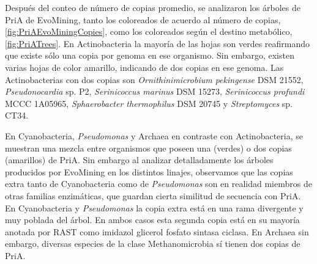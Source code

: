 \documentclass[12pt,twoside]{reedthesis}
\begin{document}
  Después del conteo de número de copias promedio, se analizaron los
  árboles de PriA de EvoMining, tanto los coloreados de acuerdo al número
  de copias, \autoref{fig:PriAEvoMiningCopies}, como los coloreados según
  el destino metabólico, \autoref{fig:PriATrees}. En Actinobacteria la
  mayoría de las hojas son verdes reafirmando que existe sólo una copia
  por genoma en ese organismo. Sin embargo, existen varias hojas de color
  amarillo, indicando de dos copias en ese genoma. Las Actinobacterias con
  dos copias son \emph{Ornithinimicrobium pekingense} DSM 21552,
  \emph{Pseudonocardia} sp. P2, \emph{Serinicoccus marinus} DSM 15273,
  \emph{Serinicoccus profundi} MCCC 1A05965, \emph{Sphaerobacter
  thermophilus} DSM 20745 y \emph{Streptomyces} sp. CT34.
  
  En Cyanobacteria, \emph{Pseudomonas} y Archaea en contraste con
  Actinobacteria, se muestran una mezcla entre organismos que poseen una
  (verdes) o dos copias (amarillos) de PriA. Sin embargo al analizar
  detalladamente los árboles producidos por EvoMining en los distintos
  linajes, observamos que las copias extra tanto de Cyanobacteria como de
  \emph{Pseudomonas} son en realidad miembros de otras familias
  enzimáticas, que guardan cierta similitud de secuencia con PriA. En
  Cyanobacteria y \emph{Pseudomonas} la copia extra está en una rama
  divergente y muy poblada del árbol. En ambos casos esta segunda copia
  está en su mayoría anotada por RAST como imidazol glicerol fosfato
  sintasa ciclasa. En Archaea sin embargo, diversas especies de la clase
  Methanomicrobia sí tienen dos copias de PriA.
  
\end{document}
